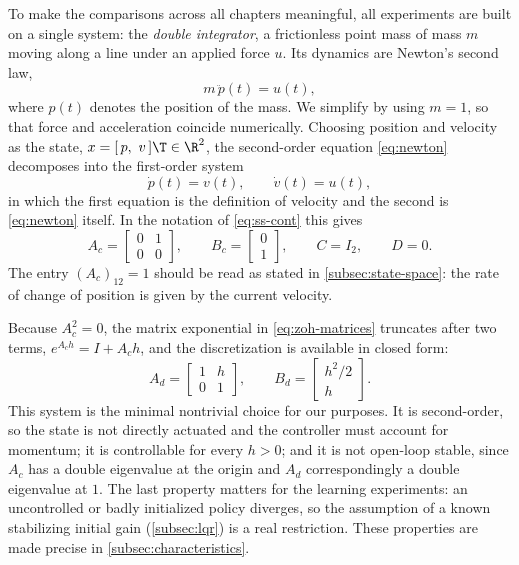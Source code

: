 To make the comparisons across all chapters
meaningful, all experiments are built on a single system: the
\emph{double integrator}, a frictionless point mass of mass $m$ moving along a
line under an applied force $u$. Its dynamics are Newton's second law,
\begin{equation}
    \label{eq:newton}
    m \, \ddot{p}(t) = u(t),
\end{equation}
where $p(t)$ denotes the position of the mass. We simplify by using $m = 1$, so that
force and acceleration coincide numerically. Choosing position and velocity as
the state, $x = [\,p,\ v\,]\T \in \R^{2}$, the second-order equation
\eqref{eq:newton} decomposes into the first-order system
\begin{equation}
    \label{eq:di-first-order}
    \dot{p}(t) = v(t),
    \qquad
    \dot{v}(t) = u(t),
\end{equation}
in which the first equation is the definition of velocity and the second is
\eqref{eq:newton} itself. In the notation of \eqref{eq:ss-cont} this gives
\begin{equation}
    \label{eq:di-cont-matrices}
    A_c = \begin{bmatrix} 0 & 1 \\ 0 & 0 \end{bmatrix},
    \qquad
    B_c = \begin{bmatrix} 0 \\ 1 \end{bmatrix},
    \qquad
    C = I_2, \qquad D = 0 .
\end{equation}
The entry $(A_c)_{12} = 1$ should be read as stated in \cref{subsec:state-space}:
the rate of change of position is given by the current velocity.
 
Because $A_c^{2} = 0$, the matrix exponential in
\eqref{eq:zoh-matrices} truncates after two terms, $e^{A_c h} = I + A_c h$, and
the discretization is available in closed form:
\begin{equation}
    \label{eq:di-disc-matrices}
    A_d = \begin{bmatrix} 1 & h \\ 0 & 1 \end{bmatrix},
    \qquad
    B_d = \begin{bmatrix} h^{2}/2 \\ h \end{bmatrix}.
\end{equation}
This system is the minimal nontrivial choice for our purposes. It is
second-order, so the state is not directly actuated and the controller must
account for momentum; it is controllable for every $h > 0$; and it is not
open-loop stable, since $A_c$ has a double eigenvalue at the origin and $A_d$
correspondingly a double eigenvalue at $1$. The last property matters for the
learning experiments: an uncontrolled or badly initialized policy diverges, so
the assumption of a known stabilizing initial gain (\cref{subsec:lqr}) is a real
restriction. These properties are made precise in
\cref{subsec:characteristics}.


